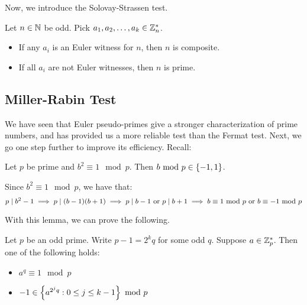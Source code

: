 \documentclass{article}
\begin{document}
Now, we introduce the Solovay-Strassen test.

\begin{defn}[source=Primary Source Material]
    Let $ n \in \mathbb{N} $ be odd. Pick $ a_{1}, a_{2}, \dots, a_{k} \in \mathbb{Z}_{n}^{*} $.
    \begin{itemize}
        \item If any $ a_{i} $ is an Euler witness for $ n $, then $ n $ is composite.
        \item If all $ a_{i} $ are not Euler witnesses, then $ n $ is prime.
    \end{itemize}
\end{defn}

\subsection{Miller-Rabin Test}

We have seen that Euler pseudo-primes give a stronger characterization of prime numbers, and
has provided us a more reliable test than the Fermat test.
Next, we go one step further to improve its efficiency. Recall:

\begin{lm}
    Let $ p $ be prime and $ b^{2} \equiv 1 \mod p $.
    Then $ b \ \mathrm{mod}\ p \in \left\{{-1, 1}\right\} $.
\end{lm}

\begin{pf}[source=Primary Source Material]
    Since $ b^{2} \equiv 1 \mod p $, we have that:
    \begin{equation*}
        p \mid b^{2}-1 \implies p \mid (b-1)(b+1) \implies p \mid b-1 \textrm{ or }
        p \mid b+1 \implies b \equiv 1 \ \mathrm{mod}\ p \textrm{ or } b \equiv -1 \ \mathrm{mod}\ p
    \end{equation*}
\end{pf}

With this lemma, we can prove the following.

\begin{thm}
    Let $ p $ be an odd prime. Write $ p - 1 = 2^{k}q $ for some odd $ q $.
    Suppose $ a \in \mathbb{Z}_{p}^{*} $. Then one of the following holds:
    \begin{itemize}
        \item $ a^{q} \equiv 1 \mod p $
        \item $ -1 \in \left\{{a^{2^{j}q} : 0 \leq j \leq k - 1}\right\} \ \mathrm{mod}\ p $
    \end{itemize}
\end{thm}
\end{document}
